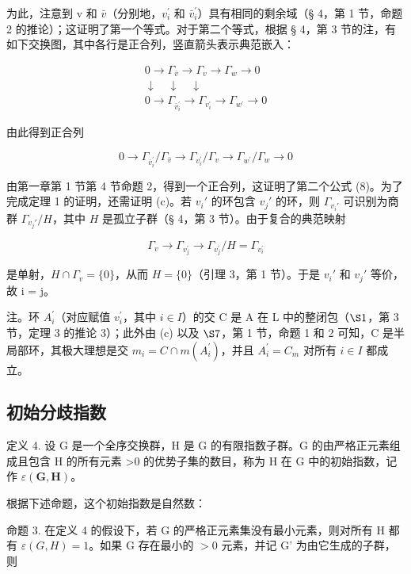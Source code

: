 为此，注意到 v 和 \(\bar{v}\)（分别地，\(v_{i}^{\prime}\) 和 \(\bar{v}_{i}^{\prime}\)）具有相同的剩余域（§ 4，第 1 节，命题 2 的推论）；这证明了第一个等式。对于第二个等式，根据 § 4，第 3 节的注，有如下交换图，其中各行是正合列，竖直箭头表示典范嵌入：

\[
\begin{array}{c} 0 \to \Gamma_ {\bar {v}} \to \Gamma_ {v} \to \Gamma_ {w} \to 0 \\ \downarrow \quad \downarrow \quad \downarrow \\ 0 \to \Gamma_ {\bar {v} _ {i} ^ {\prime}} \to \Gamma_ {v _ {i} ^ {\prime}} \to \Gamma_ {w ^ {\prime}} \to 0 \end{array}
\]

由此得到正合列

\[
0 \rightarrow \Gamma_ {\bar {v} _ {i} ^ {\prime}} / \Gamma_ {\bar {v}} \rightarrow \Gamma_ {v _ {i} ^ {\prime}} / \Gamma_ {v} \rightarrow \Gamma_ {w ^ {\prime}} / \Gamma_ {w} \rightarrow 0
\]

由第一章第 1 节第 4 节命题 2，得到一个正合列，这证明了第二个公式 (8)。为了完成定理 1 的证明，还需证明 (c)。若 \(v_i'\) 的环包含 \(v_j'\) 的环，则 \(\Gamma_{v_i'}\) 可识别为商群 \(\Gamma_{v_j'} / H\)，其中 \(H\) 是孤立子群（§ 4，第 3 节）。由于复合的典范映射

\[
\Gamma_ {v} \rightarrow \Gamma_ {v _ {j} ^ {\prime}} \rightarrow \Gamma_ {v _ {j} ^ {\prime}} / H = \Gamma_ {v _ {i} ^ {\prime}}
\]

是单射，\(H \cap \Gamma_{v} = \{0\}\)，从而 \(H = \{0\}\)（引理 3，第 1 节）。于是 \(v_{i}'\) 和 \(v_{j}'\) 等价，故 i = j。

注。环 \(A_{i}^{\prime}\)（对应赋值 \(v_{i}^{\prime}\)，其中 \(i \in I\)）的交 C 是 A 在 L 中的整闭包（\(\S 1\)，第 3 节，定理 3 的推论 3）；此外由 (c) 以及 \(\S 7\)，第 1 节，命题 1 和 2 可知，C 是半局部环，其极大理想是交 \(m_{i} = C \cap m(A_{i}^{\prime})\)，并且 \(A_{i}^{\prime} = C_{m}\) 对所有 \(i \in I\) 都成立。

\subsection{初始分歧指数}

定义 4. 设 G 是一个全序交换群，H 是 G 的有限指数子群。G 的由严格正元素组成且包含 H 的所有元素 \textgreater0 的优势子集的数目，称为 H 在 G 中的初始指数，记作 \(\varepsilon(\mathbf{G}, \mathbf{H})\)。

根据下述命题，这个初始指数是自然数：

命题 3. 在定义 4 的假设下，若 G 的严格正元素集没有最小元素，则对所有 H 都有 \(\varepsilon(G, H) = 1\)。如果 G 存在最小的 \(>0\) 元素，并记 G' 为由它生成的子群，则

